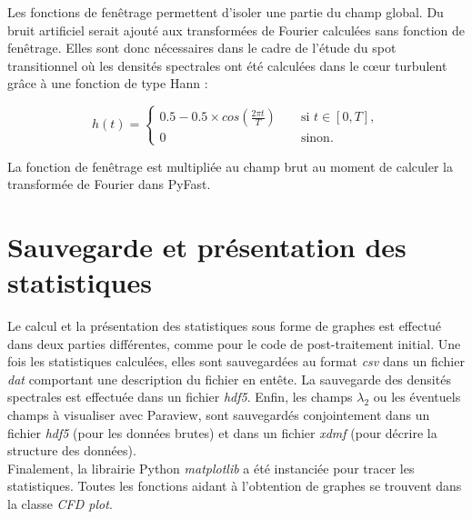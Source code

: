 Les fonctions de fenêtrage permettent d'isoler une partie du champ global. Du bruit artificiel serait ajouté aux transformées de Fourier calculées sans fonction de fenêtrage. Elles sont donc nécessaires dans le cadre de l'étude du spot transitionnel où les densités spectrales ont été calculées dans le cœur turbulent grâce à une fonction de type Hann :

\begin{equation}
    h(t) = \left\{ \begin{array}{lll}
    0.5 - 0.5 \times cos\left( \frac{2 \pi t}{T} \right) && \text{ si } t \in [0,T],\\
    0 && \text{ sinon}.
    \end{array} \right.
\end{equation}

La fonction de fenêtrage est multipliée au champ brut au moment de calculer la transformée de Fourier dans PyFast.

\section{Sauvegarde et présentation des statistiques}

Le calcul et la présentation des statistiques sous forme de graphes est effectué dans deux parties différentes, comme pour le code de post-traitement initial. Une fois les statistiques calculées, elles sont sauvegardées au format \textit{csv} dans un fichier \textit{dat} comportant une description du fichier en entête. La sauvegarde des densités spectrales est effectuée dans un fichier \textit{hdf5}. Enfin, les champs $\lambda_{2}$ ou les éventuels champs à visualiser avec Paraview, sont sauvegardés conjointement dans un fichier \textit{hdf5} (pour les données brutes) et dans un fichier \textit{xdmf} (pour décrire la structure des données).\\

Finalement, la librairie Python \textit{matplotlib} a été instanciée pour tracer les statistiques. Toutes les fonctions aidant à l'obtention de graphes se trouvent dans la classe \textit{CFD plot}.
